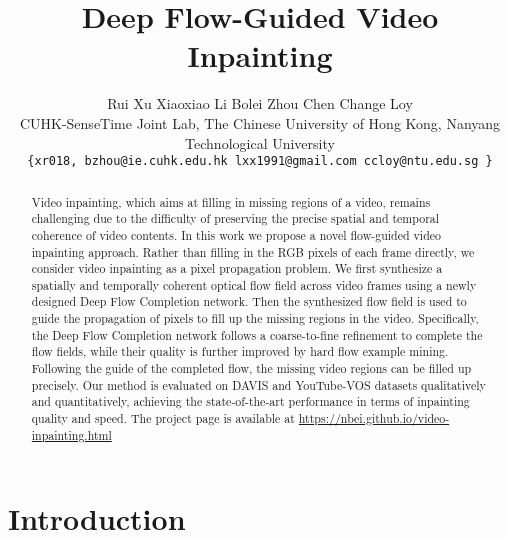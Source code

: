 \documentclass[10pt,twocolumn,letterpaper]{article}
\begin{document}
\title{Deep Flow-Guided Video Inpainting}

\author{Rui Xu \hspace{9pt} Xiaoxiao Li \hspace{9pt} Bolei Zhou \hspace{9pt} Chen Change Loy \\
	\small{ CUHK-SenseTime Joint Lab, The Chinese University of Hong Kong,
		 Nanyang Technological University} \\ 
	{\tt\small \{xr018, bzhou@ie.cuhk.edu.hk \hspace{5pt} lxx1991@gmail.com \hspace{5pt} ccloy@ntu.edu.sg \}}
 }
\maketitle
\thispagestyle{empty}

\begin{abstract}


Video inpainting, which aims at filling in missing regions of  a video, remains challenging due to the difficulty of preserving the precise spatial and temporal coherence of video contents. In this work we propose a novel flow-guided video inpainting approach. Rather than filling in the RGB pixels of each frame directly, we consider video inpainting as a pixel propagation problem. We first synthesize a spatially and temporally coherent optical flow field across video frames using a newly designed Deep Flow Completion network. Then the synthesized flow field is used to guide the propagation of pixels to fill up the missing regions in the video. Specifically, the Deep Flow Completion network follows a coarse-to-fine refinement to complete the flow fields, while their quality is further improved by hard flow example mining. Following the guide of the completed flow, the missing video regions can be filled up precisely. Our method is evaluated on DAVIS and YouTube-VOS datasets qualitatively and quantitatively, achieving the state-of-the-art performance in terms of inpainting quality and speed. The project page is available at \url{https://nbei.github.io/video-inpainting.html}



 \end{abstract}

\section{Introduction}
\label{sec:intro}
\end{document}
